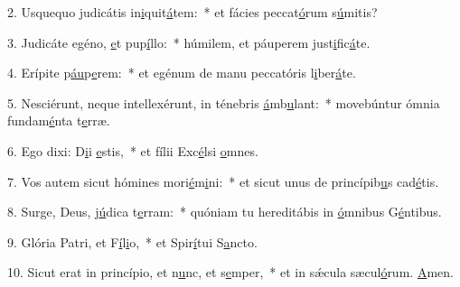 2. Usquequo judicátis in\uline{i}quit\uline{á}tem:~* et fácies peccat\uline{ó}rum s\uline{ú}mitis?\par 
3. Judicáte egéno, \uline{e}t pup\uline{í}llo:~* húmilem, et páuperem just\uline{i}fic\uline{á}te.\par 
4. Erípite p\uline{áu}p\uline{e}rem:~* et egénum de manu peccatóris l\uline{i}ber\uline{á}te.\par 
5. Nesciérunt, neque intellexérunt, in ténebris \uline{á}mb\uline{u}lant:~* movebúntur ómnia fundam\uline{é}nta t\uline{e}rræ.\par 
6. Ego dixi: D\uline{i}i \uline{e}stis,~* et fílii Exc\uline{é}lsi \uline{o}mnes.\par 
7. Vos autem sicut hómines mori\uline{é}m\uline{i}ni:~* et sicut unus de princípib\uline{u}s cad\uline{é}tis.\par 
8. Surge, Deus, j\uline{ú}dica t\uline{e}rram:~* quóniam tu hereditábis in \uline{ó}mnibus G\uline{é}ntibus.\par 
9. Glória Patri, et F\uline{í}l\uline{i}o,~* et Spir\uline{í}tui S\uline{a}ncto.\par 
10. Sicut erat in princípio, et n\uline{u}nc, et s\uline{e}mper,~* et in sǽcula sæcul\uline{ó}rum. \uline{A}men.\par 
